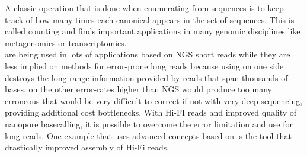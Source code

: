 A classic operation that is done when enumerating \kmers from sequences is to keep track of how many times each canonical \kmer appears in the set of sequences. This is called \kmer counting and finds important applications in many genomic disciplines like metagenomics or transcriptomics.\\
\kmers are being used in lots of applications based on NGS short reads while they are less implied on methods for error-prone long reads because using \kmers on one side destroys the long range information provided by reads that span thousands of bases, on the other error-rates higher than NGS would produce too many erroneous \kmers that would be very difficult to correct if not with very deep sequencing, providing additional cost bottlenecks. With Hi-FI reads and improved quality of nanopore basecalling, it is possible to overcome the error limitation and use \kmers for long reads. One example that uses advanced concepts based on \kmers is the tool \mdbg that drastically improved assembly of Hi-Fi reads.\\ 
